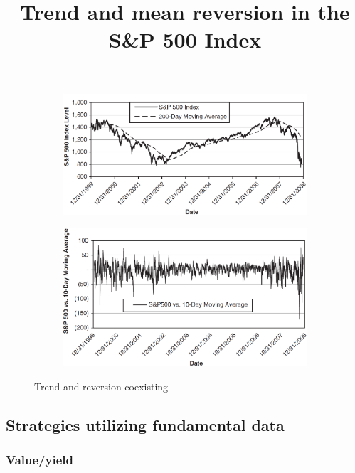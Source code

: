 \documentclass[11pt]{report}
\begin{document}
					\begin{figure}[htbp]
						\centering
						\title {Trend and mean reversion in the  S\&P 500 Index}
						\begin{subfigure}[b] {0.9\textwidth}
							\includegraphics[width=\linewidth]{snp500trend.png}	
						\end{subfigure}
						\begin{subfigure}[b] {0.9\textwidth}
							\includegraphics[width=\linewidth]{snp500reversion.png}	
						\end{subfigure}
						\caption{Trend and reversion coexisting}
						\label{fig:snp500trendreversion}
					\end{figure}

			\subsection{Strategies utilizing fundamental data}

				\subsubsection{Value/yield}
\end{document}
